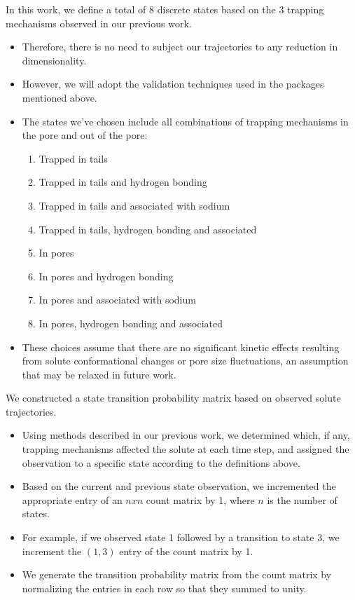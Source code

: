 \documentclass{article}
\begin{document}
  In this work, we define a total of 8 discrete states based on the 3 trapping
  mechanisms observed in our previous work. 
  \begin{itemize}
  	\item Therefore, there is no need to subject our trajectories to any reduction
  	in dimensionality. 
  	\item However, we will adopt the validation techniques used in the packages
  	mentioned above.  
  	\item The states we've chosen include all combinations of trapping mechanisms 
  	in the pore and out of the pore:
  	\begin{enumerate}
  	  \item Trapped in tails
  	  \item Trapped in tails and hydrogen bonding
  	  \item Trapped in tails and associated with sodium
  	  \item Trapped in tails, hydrogen bonding and associated
  	  \item In pores
  	  \item In pores and hydrogen bonding
  	  \item In pores and associated with sodium
  	  \item In pores, hydrogen bonding and associated
  	\end{enumerate}
  	\item These choices assume that there are no significant kinetic effects resulting
  	from solute conformational changes or pore size fluctuations, an assumption 
  	that may be relaxed in future work.
  \end{itemize}
  
  
  \noindent We constructed a state transition probability matrix based on observed solute
  trajectories.
  \begin{itemize}
    \item Using methods described in our previous work, we determined 	
    which, if any, trapping mechanisms affected the solute at each time step, and
    assigned the observation to a specific state according to the definitions 
    above.~\cite{coscia_chemically_2019}
    \item Based on the current and previous state observation, we incremented the
    appropriate entry of an $n x n$ count matrix by 1, where $n$ is the number of states.
    \item For example, if we observed state 1 followed by a transition to state 3,
    we increment the $(1, 3)$ entry of the count matrix by 1.
    \item We generate the transition probability matrix from the count matrix by 
    normalizing the entries in each row so that they summed to unity.
  \end{itemize}
  
\end{document}

